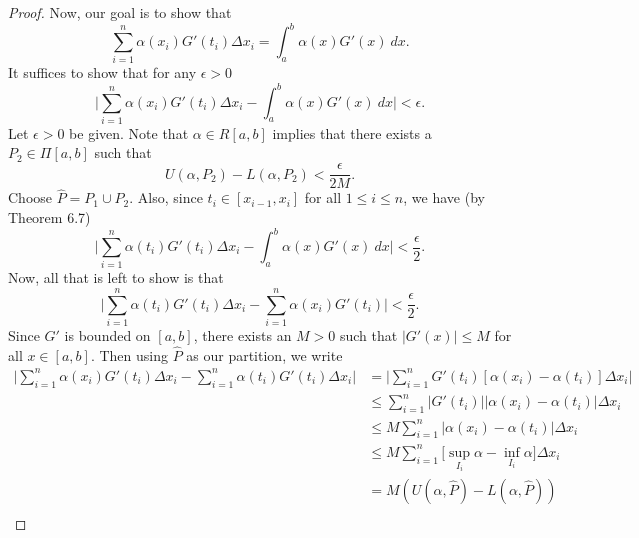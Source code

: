 \documentclass[a4paper]{article}
\begin{document}
\begin{proof}
Now, our goal is to show that
\[  \sum_{ i=1  }^{ n } \alpha({x}_{i}) G'({t}_{i}) \Delta {x}_{i} = \int_{ a }^{ b } \alpha(x) G'(x) \ dx.  \]
 It suffices to show that for any \( \epsilon > 0  \)
\[  \Big| \sum_{ i=1  }^{ n } \alpha({x}_{i}) G'({t}_{i}) \Delta {x}_{i} - \int_{ a }^{ b }  \alpha(x) G'(x) \ dx  \Big|  < \epsilon. \]
Let \( \epsilon > 0  \) be given.
Note that \( \alpha \in R[a,b] \) implies that there exists a \( {P}_{2} \in \Pi[a,b] \) such that   
\[  U(\alpha,  {P}_{2}) - L(\alpha, {P}_{2}) < \frac{ \epsilon }{ 2 M  }. \]
Choose \( \hat{P} = {P}_{1} \cup {P}_{2} \).
 Also, since \( {t}_{i} \in [{x}_{i-1}, {x}_{i}] \) for all \( 1 \leq i \leq n  \), we have (by Theorem 6.7) 
\[  \Big| \sum_{ i=1  }^{ n } \alpha({t}_{i}) G'({t}_{i}) \Delta {x}_{i} - \int_{ a }^{ b }  \alpha(x) G'(x) \ dx \Big| < \frac{ \epsilon }{ 2 }. \]
Now, all that is left to show is that 
\[ \Big| \sum_{ i=1  }^{ n  } \alpha({t}_{i}) G'({t}_{i}) \Delta {x}_{i} - \sum_{ i=1  }^{ n } \alpha({x}_{i}) G'({t}_{i}) \Big| < \frac{ \epsilon }{ 2 }.   \]
Since \( G'  \) is bounded on \( [a,b] \), there exists an \( M > 0  \) such that \( | G'(x) | \leq M  \) for all \( x \in [a,b] \).  Then using \( \hat{P} \) as our partition, we write
\begin{align*}
    \Big| \sum_{ i=1  }^{ n } \alpha({x}_{i}) G'({t}_{i}) \Delta {x}_{i} - \sum_{ i=1  }^{ n } \alpha({t}_{i}) G'({t}_{i}) \Delta {x}_{i} \Big|  &= \Big| \sum_{ i=1  }^{ n } G'({t}_{i}) [\alpha({x}_{i}) - \alpha({t}_{i})] \Delta {x}_{i} \Big|  \\
                                                                                                                                                 &\leq \sum_{ i=1  }^{ n } | G'({t}_{i}) | | \alpha({x}_{i})  - \alpha({t}_{i})  | \Delta {x}_{i} \\
                                                                                                                                                 &\leq M \sum_{ i=1  }^{ n } | \alpha({x}_{i}) - \alpha({t}_{i}) | \Delta {x}_{i} \\
                                                                                                                                                 &\leq M \sum_{ i=1  }^{ n } \Big[ \sup_{{I}_{i}} \alpha - \inf_{{I}_{i}} \alpha  \Big] \Delta {x}_{i} \\
                                                                                                                                                 &= M (U(\alpha, \hat{P}) - L(\alpha, \hat{P})) \\

\end{align*}
\end{proof}
\end{document}
